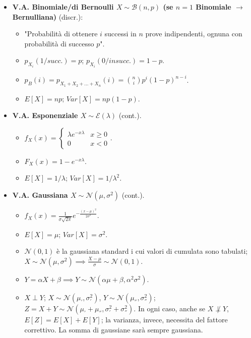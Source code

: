 \documentclass[8pt]{extarticle}
\begin{document}
\begin{multicols*}{3}
\begin{itemize}
        \item \textbf{V.A. Binomiale/di Bernoulli $X\sim\mathcal{B}(n,p)$ (se $n=1$ Binomiale $\rightarrow$ Bernulliana)} (discr.):
              \begin{itemize}
                  \item "Probabilità di ottenere $i$ successi in $n$ prove indipendenti, ognuna con probabilità di successo $p$".
                  \item $p_{X_{i}}(1/succ.)=p$; $p_{X_{i}}(0/insucc.)=1-p$.
                  \item $p_{B}(i)=p_{X_{1}+X_{2}+...+X_{n}}(i)=\binom{n}{i}p^{i}(1-p)^{n-i}$.
                  \item $E[X]=np$; $Var[X]=np(1-p)$.
              \end{itemize}
        \item \textbf{V.A. Esponenziale $X\sim\mathcal{E}(\lambda)$} (cont.).
              \begin{itemize}
                  \item $f_{X}(x)=\begin{cases}
                                \lambda e^{-x\lambda} & x\geq 0 \\
                                0                     & x<0
                            \end{cases}$.
                  \item $F_{X}(x)=1-e^{-x\lambda}$.
                  \item $E[X]=1/\lambda$; $Var[X]=1/\lambda^{2}$.
              \end{itemize}
        \item \textbf{V.A. Gaussiana $X\sim\mathcal{N}(\mu,\sigma^{2})$} (cont.).
              \begin{itemize}
                  \item $f_{X}(x)=\frac{1}{\sigma\sqrt{2\pi}}e^{-\frac{(x-\mu)^{2}}{2\sigma^{2}}}$.
                  \item $E[X]=\mu$; $Var[X]=\sigma^{2}$.
                  \item $\mathcal{N}(0,1)$ è la gaussiana standard i cui valori di cumulata sono tabulati; $X\sim\mathcal{N}(\mu, \sigma^{2})\implies \frac{X-\mu}{\sigma}\sim\mathcal{N}(0,1)$.
                  \item $Y=\alpha X+\beta\implies Y\sim\mathcal{N}(\alpha\mu +\beta,\alpha^{2}\sigma^{2})$.
                  \item $X\perp Y$; $X\sim\mathcal{N}(\mu_{'}, \sigma_{'}^{2})$, $Y\sim\mathcal{N}(\mu_{''}, \sigma_{''}^{2})$; $Z=X+Y\sim\mathcal{N}(\mu_{'}+\mu_{''}, \sigma_{'}^{2}+\sigma_{''}^{2})$. In ogni caso, anche se $X\not\perp Y$, $E[Z]=E[X]+E[Y]$; la varianza, invece, necessita del fattore correttivo. La somma di gaussiane sarà sempre gaussiana.
              \end{itemize}
    \end{itemize}


\end{multicols*}
\end{document}
